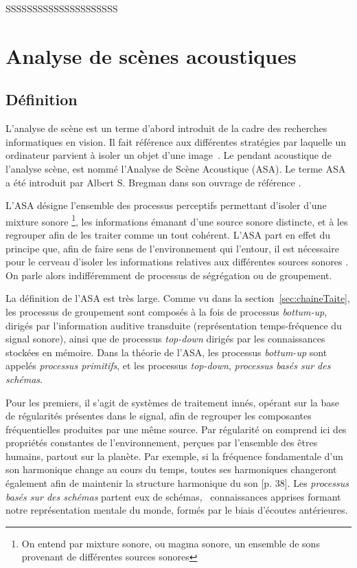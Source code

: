 SSSSSSSSSSSSSSSSSSSSS\section{Analyse de scènes acoustiques}
\label{sec:ASA}

\subsection{Définition}
\label{sec:ASAintro}

L'analyse de scène est un terme d'abord introduit de la cadre des recherches informatiques en vision. Il fait référence aux différentes stratégies par laquelle un ordinateur parvient à isoler un objet d'une image~\citep[p. 12]{mcadams1994penser}. Le pendant acoustique de l'analyse scène, est nommé l'Analyse de Scène Acoustique (ASA). Le terme ASA a été introduit par Albert S. Bregman dans son ouvrage de référence \citep{bregman1994auditory}.  

L'ASA désigne l'ensemble des processus perceptifs permettant d'isoler d'une mixture sonore \footnote{On entend par mixture sonore, ou magma sonore, un ensemble de sons provenant de différentes sources sonores}, les informations émanant d'une source sonore distincte, et à les regrouper afin de les traiter comme un tout cohérent.  L'ASA part en effet du principe que, afin de faire sens de l'environnement qui l'entour, il est nécessaire pour le cerveau d'isoler les informations relatives aux différentes sources sonores \citep{winkler2009modeling}. On parle alors indifféremment de processus de ségrégation ou de groupement.

La définition de l'ASA est très large. Comme vu dans la section~\ref{sec:chaineTaite}, les processus de groupement sont composés à la fois de processus \emph{bottum-up}, \ie~ dirigés par l'information auditive transduite (représentation temps-fréquence du signal sonore), ainsi que de processus \emph{top-down} dirigés par les connaissances stockées en mémoire. Dans la théorie de l'ASA, les processus \emph{bottum-up} sont appelés \emph{processus primitifs}, et les processus  \emph{top-down}, \emph{processus basés sur des schémas}. 

Pour les premiers, il s'agit de systèmes de traitement innés, opérant sur la base de régularités présentes dans le signal, afin de regrouper les composantes fréquentielles produites par une même source. Par régularité on comprend ici des propriétés constantes de l'environnement, perçues par l'ensemble des êtres humains, partout sur la planète. Par exemple, si la fréquence fondamentale d'un son harmonique change au cours du temps, toutes ses harmoniques changeront également afin de maintenir la structure harmonique du son [p. 38]\citep{bregman1994auditory}. Les \emph{processus basés sur des schémas}  partent eux de schémas, \ie~connaissances apprises formant notre représentation mentale du monde, formés par le biais d'écoutes antérieures. 

